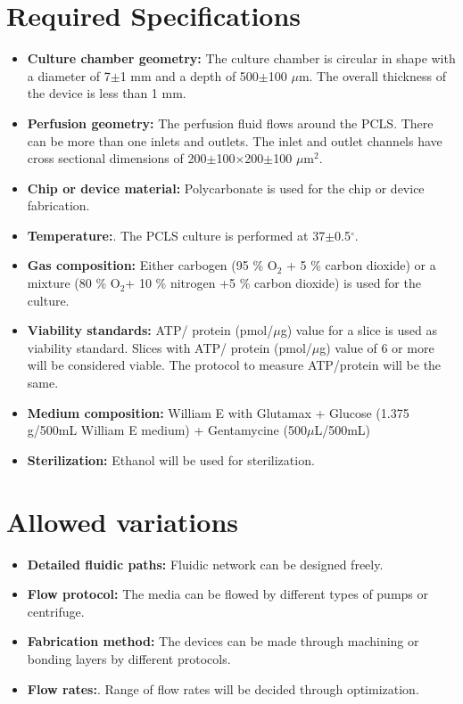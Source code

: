 \documentclass[11pt]{article}
\begin{document}
\section{Required Specifications}
\begin{itemize}
\item \textbf{Culture chamber geometry:} The culture chamber is circular in shape with a diameter of 7$\pm$1 mm and a depth of 500$\pm$100 $\mu$m. The overall thickness of the device is less than 1 mm.
\item \textbf{Perfusion geometry:} The perfusion fluid flows around the PCLS. There can be more than one inlets and outlets. The inlet and outlet channels have cross sectional dimensions of 200$\pm$100$\times$200$\pm$100 $\mu$m$^2$. 
\item \textbf{Chip or device material:} Polycarbonate is used for the chip or device fabrication.
\item \textbf{Temperature:}. The PCLS culture is performed at 37$\pm$0.5$^{\circ}$.
\item \textbf{Gas composition:} Either carbogen (95 \% O$_2$ + 5 \% carbon dioxide) or a mixture (80 \% O$_2$+ 10 \% nitrogen +5 \% carbon dioxide) is used for the culture.
\item \textbf{Viability standards:} ATP/ protein (pmol/$\mu$g)  value for a slice is used as viability standard. Slices with   ATP/ protein (pmol/$\mu$g) value of 6 or more will be considered viable. The protocol to measure ATP/protein will be the same.
\item \textbf{Medium composition:} William E  with Glutamax + Glucose (1.375 g/500mL William E medium) + Gentamycine (500$\mu$L/500mL)
\item \textbf{Sterilization:} Ethanol will be used for sterilization.
\end{itemize}

\section{Allowed variations}
\begin{itemize}
\item \textbf{Detailed fluidic paths:} Fluidic network can be designed freely.
\item \textbf{Flow protocol:} The media can be flowed by different types of pumps or centrifuge. 
\item \textbf{Fabrication method:} The devices can be made through machining or bonding layers by different protocols.
\item \textbf{Flow rates:}. Range of flow rates will be decided through optimization.
\end{itemize}
\end{document}
